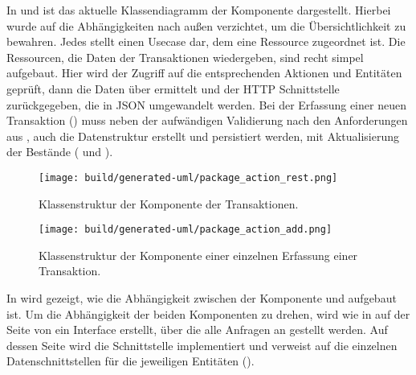 In  und  ist das aktuelle Klassendiagramm der Komponente  dargestellt. Hierbei wurde auf die Abhängigkeiten nach außen verzichtet, um die Übersichtlichkeit zu bewahren. Jedes  stellt einen Usecase dar, dem eine Ressource zugeordnet ist. Die Ressourcen, die Daten der Transaktionen wiedergeben, sind recht simpel aufgebaut. Hier wird der Zugriff auf die entsprechenden Aktionen und Entitäten geprüft, dann die Daten über  ermittelt und der HTTP Schnittstelle zurückgegeben, die in \ac{JSON} umgewandelt werden. Bei der Erfassung einer neuen Transaktion () muss neben der aufwändigen Validierung nach den Anforderungen aus , auch die Datenstruktur erstellt und persistiert werden, mit Aktualisierung der Bestände ( und ). 

\begin{figure}
  \centering
  \texttt{[image: build/generated-uml/package\_action\_rest.png]}
   \caption{Klassenstruktur der Komponente  \bzgl der Transaktionen.}
   \label{fig:package_action_rest}
\end{figure}

\begin{figure}
  \centering
  \texttt{[image: build/generated-uml/package\_action\_add.png]}
   \caption{Klassenstruktur der Komponente  \bzgl einer einzelnen Erfassung einer Transaktion.}
   \label{fig:package_action_add}
\end{figure}

In  wird gezeigt, wie die Abhängigkeit zwischen der Komponente  und  aufgebaut ist. Um die Abhängigkeit der beiden Komponenten zu drehen, wird wie in  auf der Seite von  ein Interface erstellt, über die alle Anfragen an  gestellt werden. Auf dessen Seite wird die Schnittstelle implementiert und verweist auf die einzelnen Datenschnittstellen für die jeweiligen Entitäten ().

